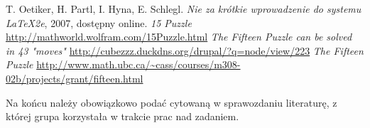 \documentclass{classrep}
\begin{document}
\begin{thebibliography}{0}
   T. Oetiker, H. Partl, I. Hyna, E. Schlegl.
    \textsl{Nie za krótkie wprowadzenie do systemu \LaTeX2e}, 2007, dostępny
    online.
   \textsl{15 Puzzle} \url{http://mathworld.wolfram.com/15Puzzle.html}
   \textsl{The Fifteen Puzzle can be solved in 43 "moves"} \url{http://cubezzz.duckdns.org/drupal/?q=node/view/223}
   \textsl{The Fifteen Puzzle} \url{http://www.math.ubc.ca/~cass/courses/m308-02b/projects/grant/fifteen.html}
\end{thebibliography}

{\color{blue}
Na końcu należy obowiązkowo podać cytowaną w sprawozdaniu literaturę, z której
grupa korzystała w trakcie prac nad zadaniem.}
\end{document}
